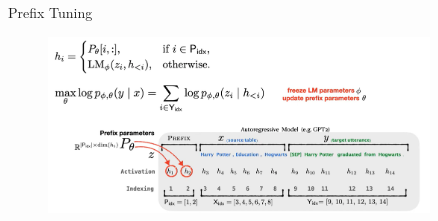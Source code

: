 \documentclass[serif, aspectratio=169]{beamer}
\begin{document}
\begin{frame}{Prefix Tuning}
    \begin{figure}
        \centering
        \includegraphics[width=0.9\textwidth, height=0.8\textheight]{pic/Prefix tuning.png}
    \end{figure}
\end{frame}
\end{document}
